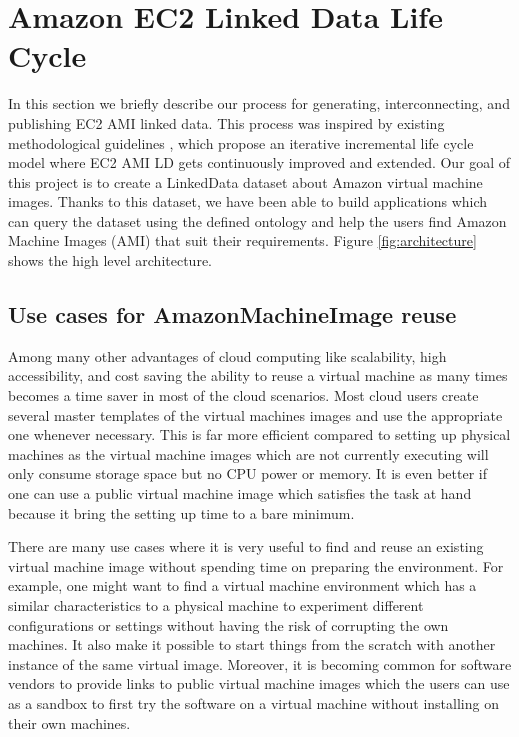 \section{Amazon EC2 Linked Data Life Cycle}\label{sec:process}
In this section we briefly describe our process for generating, interconnecting, and publishing EC2 AMI linked data. This process was inspired by existing methodological guidelines \cite{VillazonTerrazas_2011}, which propose an iterative incremental life cycle model where EC2 AMI LD gets
continuously improved and extended. Our goal of this project is to create a LinkedData dataset about Amazon virtual machine images. Thanks to this dataset, we have been able to build applications which can query the dataset using the defined ontology and help the users find Amazon Machine Images (AMI) that suit their requirements. Figure \ref{fig:architecture} shows the high level architecture.

\subsection{Use cases for AmazonMachineImage reuse}
Among many other advantages of cloud computing like scalability, high accessibility, and cost saving the ability to reuse a virtual machine as many times becomes a time saver in most of the cloud scenarios. Most cloud users create several master templates of the virtual machines images and use the appropriate one whenever necessary. This is far more efficient compared to setting up physical machines as the virtual machine images which are not currently executing will only consume storage space but no CPU power or memory. It is even better if one can use a public virtual machine image which satisfies the task at hand because it bring the setting up time to a bare minimum. 

There are many use cases where it is very useful to find and reuse an existing virtual machine image without spending time on preparing the environment. For example, one might want to find a virtual machine environment which has a similar characteristics to a physical machine to experiment different configurations or settings without having the risk of corrupting the own machines. It also make it possible to start things from the scratch with another instance of the same virtual image. Moreover, it is becoming common for software vendors to provide links to public virtual machine images which the users can use as a sandbox to first try the software on a virtual machine without installing on their own machines.    

